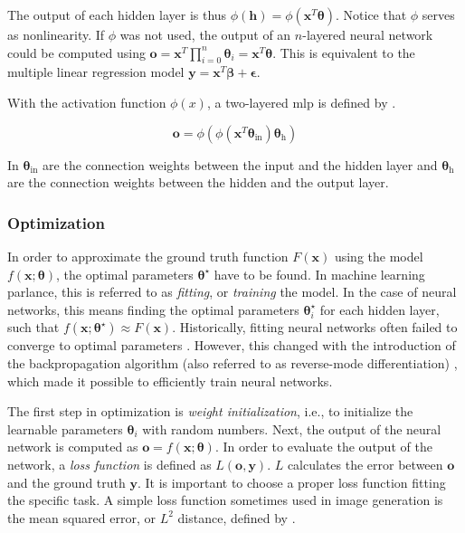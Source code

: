 The output of each hidden layer is thus $\phi(\textbf{h})=\phi(\textbf{x}^T \boldsymbol{\theta})$. Notice that $\phi$ serves as nonlinearity. If $\phi$ was not used, the output of an $n$-layered neural network could be computed using $\textbf{o} = \textbf{x}^T \prod_{i=0}^{n}\boldsymbol{\theta}_i=\textbf{x}^T \boldsymbol{\theta}$. This is equivalent to the multiple linear regression model $\textbf{y}=\textbf{x}^T \boldsymbol{\beta} + \boldsymbol{\epsilon}$.

With the activation function $\phi(x)$, a two-layered \gls{mlp} is defined by .

\begin{equation}
\label{eq:mlp.2l}
	\textbf{o} = \phi(\phi(\textbf{x}^T \boldsymbol{\theta}_{\text{in}})\boldsymbol{\theta}_{\text{h}})
\end{equation}

In  $\boldsymbol{\theta}_{\text{in}}$ are the connection weights between the input and the hidden layer and $\boldsymbol{\theta}_{\text{h}}$ are the connection weights between the hidden and the output layer.

\subsubsection{Optimization}
\label{subsec:bg.nn.optim}
In order to approximate the ground truth function $F(\textbf{x})$ using the model $f(\textbf{x};\boldsymbol{\theta})$, the optimal parameters $\boldsymbol{\theta}^\star$ have to be found. In machine learning parlance, this is referred to as \emph{fitting}, or \emph{training} the model. In the case of neural networks, this means finding the optimal parameters $\boldsymbol{\theta}^\star_i$ for each hidden layer, such that $f(\textbf{x}; \boldsymbol{\theta}^\star) \approx F(\textbf{x})$. Historically, fitting neural networks often failed to converge to optimal parameters \citep{perceptrons}. However, this changed with the introduction of the backpropagation algorithm (also referred to as reverse-mode differentiation) \citep{Dreyfus_1962, linnainmaa}, which made it possible to efficiently train neural networks.

The first step in optimization is \emph{weight initialization}, i.e., to initialize the learnable parameters $\boldsymbol{\theta}_i$ with random numbers. Next, the output of the neural network is computed as $\textbf{o}=f(\textbf{x}; \boldsymbol{\theta})$. In order to evaluate the output of the network, a \emph{loss function} is defined as $L(\textbf{o},\textbf{y})$. $L$ calculates the error between $\textbf{o}$ and the ground truth $\textbf{y}$. It is important to choose a proper loss function fitting the specific task. A simple loss function sometimes used in image generation is the mean squared error, or $L^2$ distance, defined by .

